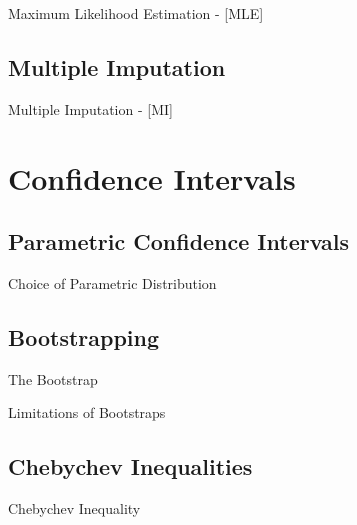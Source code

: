 \documentclass{beamer}
\begin{document}
\begin{frame}{Maximum Likelihood Estimation - [MLE] }

\end{frame}

\subsection{Multiple Imputation}

\begin{frame}{Multiple Imputation - [MI] }

\end{frame}



\section{Confidence Intervals}

\subsection{Parametric Confidence Intervals}

\begin{frame}{Choice of Parametric Distribution}

\end{frame}


\subsection{Bootstrapping}

\begin{frame}{The Bootstrap}

\end{frame}
 
\begin{frame}{Limitations of Bootstraps}

\end{frame}

\subsection{Chebychev Inequalities}

\begin{frame}{Chebychev Inequality}

\end{frame}
\end{document}
